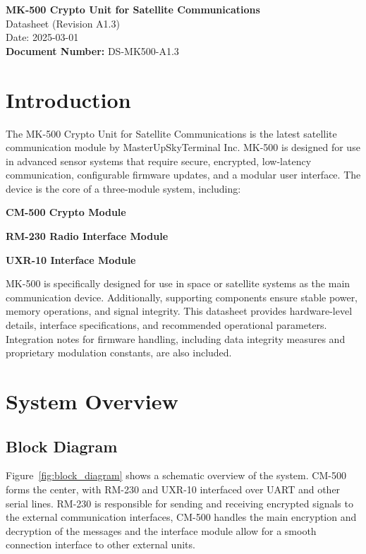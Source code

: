 \documentclass[11pt,a4paper,twocolumn]{article}
\begin{document}
\begin{center} {\huge\textbf{MK-500 Crypto Unit for Satellite Communications}\\[0.5cm]} {\Large Datasheet (Revision A1.3)}\\[0.5cm] {\large Date: 2025-03-01}\\[0.5cm]
\textbf{Document Number:} DS-MK500-A1.3
\end{center}
\vspace{1cm}
\tableofcontents

\newpage

\section{Introduction} The MK-500 Crypto Unit for Satellite Communications is the latest satellite communication module by MasterUpSkyTerminal Inc. MK-500 is designed for use in advanced sensor systems that require secure, encrypted, low-latency communication, configurable firmware updates, and a modular user interface. The device is the core of a three-module system, including:

\begin{compactitem}
\item
\textbf{CM-500 Crypto Module}
\item
\textbf{RM-230 Radio Interface Module}
\item
\textbf{UXR-10 Interface Module}
\end{compactitem} 
MK-500 is specifically designed for use in space or satellite systems as the main communication device. Additionally, supporting components ensure stable power, memory operations, and signal integrity. This datasheet provides hardware-level details, interface specifications, and recommended operational parameters. Integration notes for firmware handling, including data integrity measures and proprietary modulation constants, are also included.

\section{System Overview}
\subsection{Block Diagram} Figure~\ref{fig:block_diagram} shows a schematic overview of the system. CM-500 forms the center, with RM-230 and UXR-10 interfaced over UART and other serial lines. RM-230 is responsible for sending and receiving encrypted signals to the external communication interfaces, CM-500 handles the main encryption and decryption of the messages and the interface module allow for a smooth connection interface to other external units.  
\end{document}
